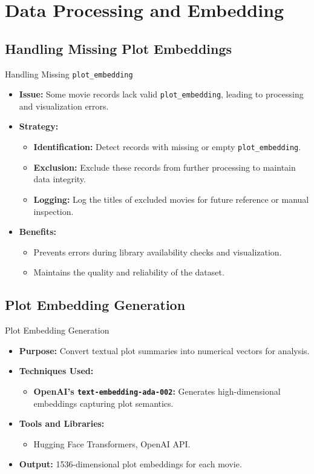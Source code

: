 \documentclass{beamer}
\begin{document}
\section{Data Processing and Embedding}
\subsection{Handling Missing Plot Embeddings}
\begin{frame}{Handling Missing \texttt{plot\_embedding}}
  \begin{itemize}
    \item \textbf{Issue:} Some movie records lack valid \texttt{plot\_embedding}, leading to processing and visualization errors.
    \item \textbf{Strategy:}
      \begin{itemize}
        \item \textbf{Identification:} Detect records with missing or empty \texttt{plot\_embedding}.
        \item \textbf{Exclusion:} Exclude these records from further processing to maintain data integrity.
        \item \textbf{Logging:} Log the titles of excluded movies for future reference or manual inspection.
      \end{itemize}
    \item \textbf{Benefits:}
      \begin{itemize}
        \item Prevents errors during library availability checks and visualization.
        \item Maintains the quality and reliability of the dataset.
      \end{itemize}
  \end{itemize}
\end{frame}

\subsection{Plot Embedding Generation}
\begin{frame}{Plot Embedding Generation}
  \begin{itemize}
    \item \textbf{Purpose:} Convert textual plot summaries into numerical vectors for analysis.
    \item \textbf{Techniques Used:}
      \begin{itemize}
        \item \textbf{OpenAI's \texttt{text-embedding-ada-002}:} Generates high-dimensional embeddings capturing plot semantics.
      \end{itemize}
    \item \textbf{Tools and Libraries:}
      \begin{itemize}
        \item Hugging Face Transformers, OpenAI API.
      \end{itemize}
    \item \textbf{Output:} 1536-dimensional plot embeddings for each movie.
  \end{itemize}
\end{frame}
\end{document}
